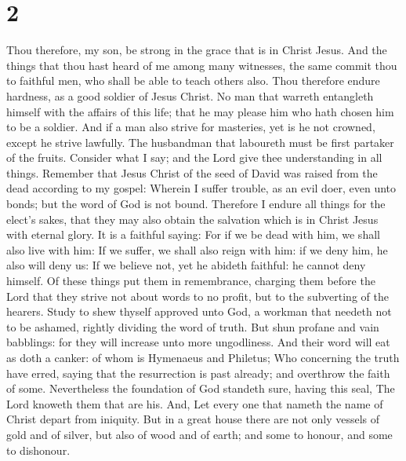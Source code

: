 \hypertarget{section-1}{%
\section{2}\label{section-1}}

 Thou therefore, my son, be strong in the grace that is in
Christ Jesus.  And the things that thou hast heard of me
among many witnesses, the same commit thou to faithful men, who shall be
able to teach others also.  Thou therefore endure
hardness, as a good soldier of Jesus Christ.  No man that
warreth entangleth himself with the affairs of this life; that he may
please him who hath chosen him to be a soldier.  And if a
man also strive for masteries, yet is he not crowned, except he strive
lawfully.  The husbandman that laboureth must be first
partaker of the fruits.  Consider what I say; and the Lord
give thee understanding in all things.  Remember that
Jesus Christ of the seed of David was raised from the dead according to
my gospel:  Wherein I suffer trouble, as an evil doer,
even unto bonds; but the word of God is not bound. 
Therefore I endure all things for the elect's sakes, that they may also
obtain the salvation which is in Christ Jesus with eternal glory.
 It is a faithful saying: For if we be dead with him, we
shall also live with him:  If we suffer, we shall also
reign with him: if we deny him, he also will deny us:  If
we believe not, yet he abideth faithful: he cannot deny himself.
 Of these things put them in remembrance, charging them
before the Lord that they strive not about words to no profit, but to
the subverting of the hearers.  Study to shew thyself
approved unto God, a workman that needeth not to be ashamed, rightly
dividing the word of truth.  But shun profane and vain
babblings: for they will increase unto more ungodliness. 
And their word will eat as doth a canker: of whom is Hymenaeus and
Philetus;  Who concerning the truth have erred, saying
that the resurrection is past already; and overthrow the faith of some.
 Nevertheless the foundation of God standeth sure, having
this seal, The Lord knoweth them that are his. And, Let every one that
nameth the name of Christ depart from iniquity.  But in a
great house there are not only vessels of gold and of silver, but also
of wood and of earth; and some to honour, and some to dishonour.
